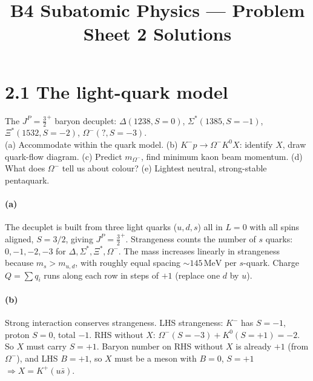 \documentclass[11pt]{article}
\title{B4 Subatomic Physics --- Problem Sheet 2 Solutions}
\author{}
\date{}
\newcommand{\Q}[1]{\begin{question}#1\end{question}}
\newcommand{\MeV}{\,\mathrm{MeV}}
\begin{document}
\maketitle

\section*{2.1 \quad The light-quark model}

\Q{The $J^P=\frac{3}{2}^+$ baryon decuplet: $\Delta(1238,S=0)$, $\Sigma^*(1385,S=-1)$, $\Xi^*(1532,S=-2)$, $\Omega^-(?,S=-3)$.\\
(a) Accommodate within the quark model. (b) $K^- p\to\Omega^- K^0 X$: identify $X$, draw quark-flow diagram. (c) Predict $m_{\Omega^-}$, find minimum kaon beam momentum. (d) What does $\Omega^-$ tell us about colour? (e) Lightest neutral, strong-stable pentaquark.}

\paragraph{(a)} The decuplet is built from three light quarks ($u,d,s$) all in $L=0$ with all spins aligned, $S=3/2$, giving $J^P=\tfrac{3}{2}^+$. Strangeness counts the number of $s$ quarks: $0,-1,-2,-3$ for $\Delta,\Sigma^*,\Xi^*,\Omega^-$. The mass increases linearly in strangeness because $m_s>m_{u,d}$, with roughly equal spacing $\sim 145\MeV$ per $s$-quark. Charge $Q=\sum q_i$ runs along each row in steps of $+1$ (replace one $d$ by $u$).

\paragraph{(b)} Strong interaction conserves strangeness. LHS strangeness: $K^-$ has $S=-1$, proton $S=0$, total $-1$. RHS without $X$: $\Omega^-(S=-3)+K^0(S=+1)=-2$. So $X$ must carry $S=+1$. Baryon number on RHS without $X$ is already $+1$ (from $\Omega^-$), and LHS $B=+1$, so $X$ must be a meson with $B=0$, $S=+1$ $\Rightarrow X=K^+(u\bar s)$.
\end{document}
